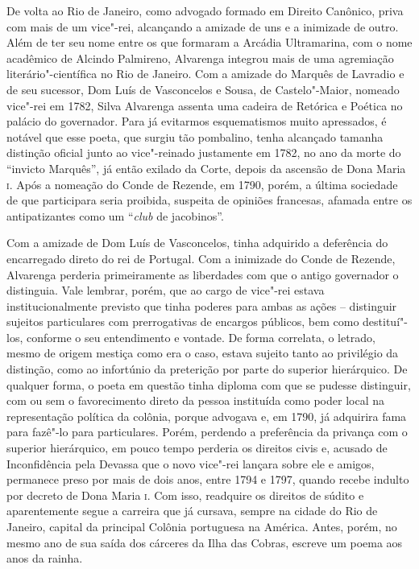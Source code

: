 De volta ao Rio de Janeiro, como advogado formado em Direito Canônico, priva com
mais de um vice"-rei, alcançando a amizade de uns e a inimizade de outro. %
Além de ter seu nome entre os que formaram a Arcádia Ultramarina, com o nome
acadêmico de Alcindo Palmireno, Alvarenga integrou mais de uma agremiação
literário"-científica no Rio de Janeiro.  Com a amizade do Marquês de Lavradio e
de seu sucessor, Dom Luís de Vasconcelos e Sousa, de Castelo"-Maior, nomeado
vice"-rei em 1782, Silva Alvarenga assenta uma cadeira de Retórica e Poética no
palácio do governador.  Para já evitarmos esquematismos muito apressados, é
notável que esse poeta, que surgiu tão pombalino, tenha alcançado tamanha
distinção oficial junto ao vice"-reinado justamente em 1782, no ano da morte do
``invicto Marquês'', já então exilado da Corte, depois da ascensão de Dona
Maria \textsc{i}.  Após a nomeação do Conde de Rezende, em 1790, porém, a última
sociedade de que participara seria proibida, suspeita de opiniões francesas,
afamada entre os antipatizantes como um ``\textit{club} de jacobinos''.


Com a amizade de Dom Luís de Vasconcelos, tinha adquirido a deferência do
encarregado direto do rei de Portugal. Com a inimizade do Conde de Rezende,
Alvarenga perderia primeiramente as liberdades com que o antigo governador o
distinguia.  Vale lembrar, porém, que ao cargo de vice"-rei estava
institucionalmente previsto que tinha poderes para ambas as ações -- distinguir
sujeitos particulares com prerrogativas de encargos públicos, bem como
destituí"-los, conforme o seu entendimento e vontade.  De forma correlata, o
letrado, mesmo de origem mestiça como era o caso, estava sujeito tanto ao
privilégio da distinção, como ao infortúnio da preterição por parte do superior
hierárquico. De qualquer forma, o poeta em questão tinha diploma com que se
pudesse distinguir, com ou sem o favorecimento direto da pessoa instituída como
poder local na representação política da colônia, porque advogava e, em 1790, já
adquirira fama para fazê"-lo para particulares.  Porém, perdendo a preferência da privança com o superior hierárquico, em pouco tempo perderia os direitos civis e, acusado de Inconfidência pela Devassa que o novo vice"-rei lançara sobre ele e amigos, permanece preso por mais de dois anos, entre 1794 e 1797, quando recebe indulto por decreto de Dona Maria \textsc{i}. Com isso, readquire os direitos de súdito e aparentemente segue a carreira que já cursava, sempre na cidade do Rio de Janeiro, capital da principal Colônia portuguesa na América. Antes, porém, no mesmo ano de sua saída dos cárceres da Ilha das Cobras, escreve um poema aos anos da rainha.  

